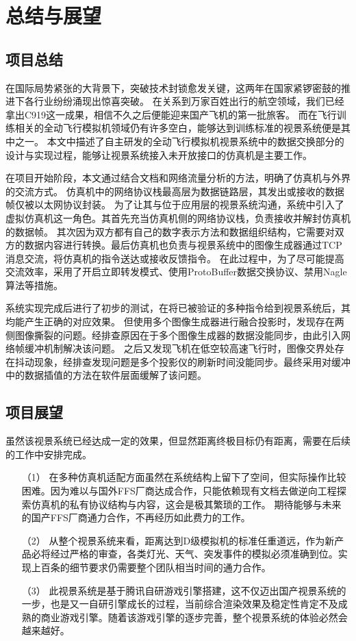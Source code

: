 \chapter{总结与展望}
\section{项目总结}
在国际局势紧张的大背景下，突破技术封锁愈发关键，这两年在国家紧锣密鼓的推进下各行业纷纷涌现出惊喜突破。
在关系到万家百姓出行的航空领域，我们已经拿出C919这一成果，相信不久之后便能迎来国产飞机的第一批旅客。
而在飞行训练相关的全动飞行模拟机领域仍有许多空白，能够达到训练标准的视景系统便是其中之一。
本文中描述了自主研发的全动飞行模拟机视景系统中的数据交换部分的设计与实现过程，能够让视景系统接入未开放接口的仿真机是主要工作。
\par
在项目开始阶段，本文通过结合文档和网络流量分析的方法，明确了仿真机与外界的交流方式。
仿真机中的网络协议栈最高层为数据链路层，其发出或接收的数据帧仅被以太网协议封装。
为了让其与位于应用层的视景系统沟通，系统中引入了虚拟仿真机这一角色。其首先充当仿真机侧的网络协议栈，负责接收并解封仿真机的数据帧。
其次因为双方都有自己的数字表示方法和数据组织结构，它需要对双方的数据内容进行转换。最后仿真机也负责与视景系统中的图像生成器通过TCP消息交流，将仿真机的指令送达或接收反馈指令。
在此过程中，为了尽可能提高交流效率，采用了开启立即转发模式、使用ProtoBuffer数据交换协议、禁用Nagle算法等措施。
\par
系统实现完成后进行了初步的测试，在将已被验证的多种指令给到视景系统后，其均能产生正确的对应效果。
但使用多个图像生成器进行融合投影时，发现存在两侧图像撕裂的问题。经排查原因在于多个图像生成器的数据没能同步，由此引入网络帧缓冲机制解决该问题。
之后又发现飞机在低空较高速飞行时，图像交界处存在抖动现象，经排查发现问题是多个投影仪的刷新时间没能同步。最终采用对缓冲中的数据插值的方法在软件层面缓解了该问题。
\section{项目展望}
虽然该视景系统已经达成一定的效果，但显然距离终极目标仍有距离，需要在后续的工作中安排完成。
\begin{itemize}
    \item [（1）]
    在多种仿真机适配方面虽然在系统结构上留下了空间，但实际操作比较困难。因为难以与国外FFS厂商达成合作，只能依赖现有文档去做逆向工程探索仿真机的私有协议结构与内容，这会是极其繁琐的工作。
    期待能够与未来的国产FFS厂商通力合作，不再经历如此费力的工作。
    \item [（2）]
    从整个视景系统来看，距离达到D级模拟机的标准任重道远，作为新产品必将经过严格的审查，各类灯光、天气、突发事件的模拟必须准确到位。实现上百条的细节要求仍需要整个团队相当时间的通力合作。
    \item [（3）]
    此视景系统是基于腾讯自研游戏引擎搭建，这不仅迈出国产视景系统的一步，也是又一自研引擎成长的过程，当前综合渲染效果及稳定性肯定不及成熟的商业游戏引擎。随着该游戏引擎的逐步完善，整个视景系统的体验必然会越来越好。
    
\end{itemize}
